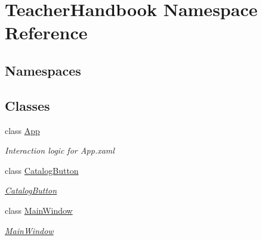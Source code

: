 \hypertarget{namespace_teacher_handbook}{}\section{Teacher\+Handbook Namespace Reference}
\label{namespace_teacher_handbook}
\subsection*{Namespaces}
\begin{DoxyCompactItemize}
\end{DoxyCompactItemize}
\subsection*{Classes}
\begin{DoxyCompactItemize}
\item 
class \mbox{\hyperlink{class_teacher_handbook_1_1_app}{App}}
\begin{DoxyCompactList}\small\item\em Interaction logic for App.\+xaml \end{DoxyCompactList}\item 
class \mbox{\hyperlink{class_teacher_handbook_1_1_catalog_button}{Catalog\+Button}}
\begin{DoxyCompactList}\small\item\em \mbox{\hyperlink{class_teacher_handbook_1_1_catalog_button}{Catalog\+Button}} \end{DoxyCompactList}\item 
class \mbox{\hyperlink{class_teacher_handbook_1_1_main_window}{Main\+Window}}
\begin{DoxyCompactList}\small\item\em \mbox{\hyperlink{class_teacher_handbook_1_1_main_window}{Main\+Window}} \end{DoxyCompactList}\end{DoxyCompactItemize}
